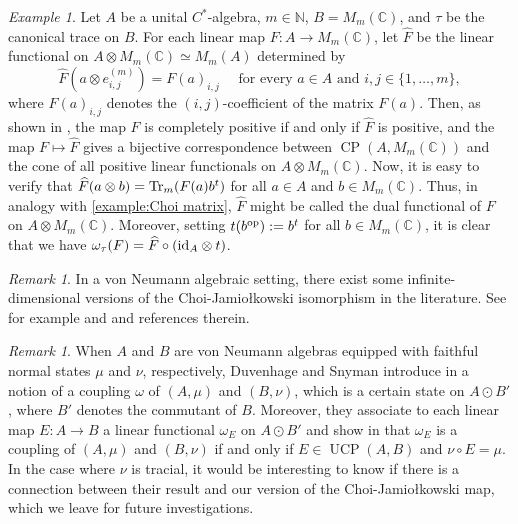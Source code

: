 \documentclass[11pt, a4paper, oneside, final, reqno]{amsart}
\newcommand{\bbN}{\mathbb{N}}
\newcommand{\bbC}{\mathbb{C}}
\newcommand{\CP}{\operatorname{CP}}
\newcommand{\UCP}{\operatorname{UCP}}
\theoremstyle{definition}
\theoremstyle{plain}
\theoremstyle{remark}
\newtheorem{remark}[definition]{Remark}
\newtheorem{example}[definition]{Example}
\numberwithin{equation}{section}
\begin{document}
\begin{example}\label{example:Characterization of cp maps into matrix algebra}
    Let $A$ be a unital $C^*$-algebra, $m \in \bbN$, $B = M_m(\bbC)$, and $\tau$ be the canonical trace on $B$. For each linear map $F \colon A \to M_m(\bbC)$, let $\widehat F$ be the linear functional on $A \otimes M_m(\bbC) \simeq M_m(A)$ determined by
    \begin{equation*}
        \widehat F ( a \otimes e_{i,j}^{(m)}) = F(a)_{i, j} \quad \text{ for every $a\in A$ and $i,j \in \{1, \ldots , m\}$},
    \end{equation*}
    where $F(a)_{i, j}$ denotes the $(i,j)$-coefficient of the matrix $F(a)$. Then, as shown in \cite[Proposition 1.5.14]{BO}, the map $F$ is completely positive if and only if $\widehat F$ is positive, and the map $F \mapsto \widehat F$ gives a bijective correspondence between $\CP(A, M_m(\bbC))$ and the cone of all positive linear functionals on $A \otimes M_m(\bbC)$. Now, it is easy to verify that $\widehat F (a \otimes b) =  {\rm Tr}_m (F(a) b^t)$ for all $a \in A$ and $b\in M_m(\bbC)$. Thus, in analogy with \cref{example:Choi matrix}, $\widehat F$ might be called the dual functional of $F$ on $A\otimes M_m(\bbC)$. Moreover, setting $t(b^{\rm op}):= b^t$ for all $b \in M_m(\bbC)$, it is clear that we have  $\omega_\tau(F) = \widehat F \circ ({\rm id}_A \otimes t)$.
\end{example}

\begin{remark}
    In a von Neumann algebraic setting, there exist some infinite-dimensional versions of the Choi-Jamio\l{}kowski isomorphism in the literature. See for example \cite{Haap2021} and \cite{HKS2024} and references therein.
\end{remark}

\begin{remark}
    When $A$ and $B$ are von Neumann algebras equipped with faithful normal states $\mu$ and $\nu$, respectively,  Duvenhage and Snyman introduce in  \cite[Definition 2.10]{DuvenhageSnyman2018} a notion of a coupling $\omega$ of $(A, \mu)$ and $(B, \nu)$, which is a certain state on $A\odot B'$, where $B'$ denotes the commutant of $B$. Moreover, they associate to each linear map $E:A\to B$ a linear functional $\omega_E$ on $A\odot B'$ and show in \cite[Proposition 3.9]{DuvenhageSnyman2018} that $\omega_E$ is a coupling of $(A, \mu)$ and $(B, \nu)$ if and only if $E\in \UCP(A, B)$ and $\nu\circ E = \mu$. In the case where $\nu$ is tracial, it would be interesting to know if there is a connection between their result and our version of the Choi-Jamio\l{}kowski map, which we leave for future investigations.
\end{remark}
\end{document}
